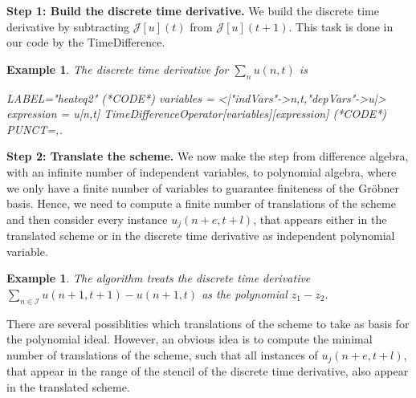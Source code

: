\documentclass[manuscript]{acmart}
\newcommand{\1}{{\chi}}
\newcommand{\Ii}{{\mathcal{I}}}
\numberwithin{equation}{section}
\theoremstyle{thmlemcorr}
\numberwithin{theorem}{section}
\theoremstyle{thmlemcorr*}
\theoremstyle{defi}
\theoremstyle{remexample}
\newtheorem{example}[theorem]{Example}
\theoremstyle{ass}
\begin{document}
{\bf Step 1: Build the discrete time derivative.}
We build the discrete time derivative by subtracting $\mathcal{J}[u](t)$ from $\mathcal{J}[u](t+1)$. This task is done in our code by the {\sc TimeDifference}.
	\begin{example}
		The discrete time derivative for $\sum_n u(n,t)$ is
		\begin{EXE}
			LABEL="heateq2"
			(*CODE*)
			variables = <|"indVars"->{n,t},"depVars"->{u}|>
			expression = u[n,t]
			TimeDifferenceOperator[variables][expression]
			(*CODE*)
			PUNCT={,.}
		\end{EXE}
		
		\begin{small}
			
			
		\end{small}
	\end{example}
{\bf Step 2: Translate the scheme.}
We now make the step from difference algebra, with an infinite number of independent variables, to polynomial algebra, where we only have a finite number of variables to guarantee finiteness of the Gr{\"o}bner basis. Hence, we need to compute a finite number of translations of the scheme and then consider every instance $u_j(n+e,t+l)$, that appears either in the translated scheme or in the discrete time derivative as independent polynomial variable.
\begin{example}
	The algorithm treats the discrete time derivative $\sum_{n\in\Ii}u(n+1,t+1)-u(n+1,t)$
	as the polynomial $z_1-z_2$.
\end{example}
There are several possiblities which translations of the scheme to take as basis for the polynomial ideal. However, an obvious idea is to compute the minimal number of translations of the scheme, such that all instances of $u_j(n+e,t+l)$, that appear in the range of the stencil of the discrete time derivative, also appear in the translated scheme.
\end{document}
